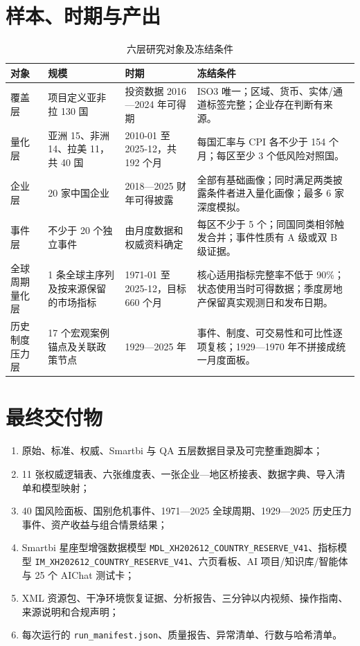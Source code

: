 \documentclass[UTF8,fontset=windows,12pt,openany]{ctexbook}
\newcommand{\Field}[1]{{\small\nolinkurl{#1}}}
\newcommand{\File}[1]{{\small\begingroup\urlstyle{same}\nolinkurl{#1}\endgroup}}
\begin{document}
\section{样本、时期与产出}

\begin{longtable}{p{3.1cm}p{3.2cm}p{3.0cm}p{4.5cm}}
\caption{六层研究对象及冻结条件}\label{tab:sample-contract}\\
\toprule
\textbf{对象} & \textbf{规模} & \textbf{时期} & \textbf{冻结条件}\\
\midrule
覆盖层 & 项目定义亚非拉 130 国 & 投资数据 2016—2024 年可得期 & ISO3 唯一；区域、货币、实体/通道标签完整；企业存在判断有来源。\\
量化层 & 亚洲 15、非洲 14、拉美 11，共 40 国 & 2010-01 至 2025-12，共 192 个月 & 每国汇率与 CPI 各不少于 154 个月；每区至少 3 个低风险对照国。\\
企业层 & 20 家中国企业 & 2018—2025 财年可得披露 & 全部有基础画像；同时满足两类披露条件者进入量化画像；最多 6 家深度模拟。\\
事件层 & 不少于 20 个独立事件 & 由月度数据和权威资料确定 & 每区不少于 5 个；同国同类相邻触发合并；事件性质有 A 级或双 B 级证据。\\
全球周期量化层 & 1 条全球主序列及按来源保留的市场指标 & 1971-01 至 2025-12，目标 660 个月 & 核心适用指标完整率不低于 90\%；状态使用当时可得数据；季度房地产保留真实观测日和发布日期。\\
历史制度压力层 & 17 个宏观案例锚点及关联政策节点 & 1929—2025 年 & 事件、制度、可交易性和可比性逐项复核；1929—1970 年不拼接成统一月度面板。\\
\bottomrule
\end{longtable}

\section{最终交付物}

\begin{enumerate}
  \item 原始、标准、权威、Smartbi 与 QA 五层数据目录及可完整重跑脚本；
  \item 11 张权威逻辑表、六张维度表、一张企业—地区桥接表、数据字典、导入清单和模型映射；
  \item 40 国风险面板、国别危机事件、1971—2025 全球周期、1929—2025 历史压力事件、资产收益与组合情景结果；
  \item Smartbi 星座型增强数据模型 \Field{MDL_XH202612_COUNTRY_RESERVE_V41}、指标模型 \Field{IM_XH202612_COUNTRY_RESERVE_V41}、六页看板、AI 项目/知识库/智能体与 25 个 AIChat 测试卡；
  \item XML 资源包、干净环境恢复证据、分析报告、三分钟以内视频、操作指南、来源说明和合规声明；
  \item 每次运行的 \File{run_manifest.json}、质量报告、异常清单、行数与哈希清单。
\end{enumerate}
\end{document}
